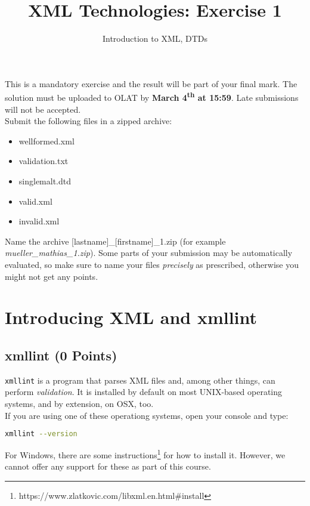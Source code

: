 \documentclass[a4paper, 12pt]{scrartcl}
\title{XML Technologies: Exercise 1}
\date{}
\subtitle{Introduction to XML, DTDs}
\begin{document}
\maketitle\vspace{-12ex}

\noindent This is a mandatory exercise and the result will be part of your final mark. The solution must be uploaded to OLAT by \textbf{March 4\textsuperscript{th} at 15:59}. Late submissions will not be accepted.\\


\noindent Submit the following files in a zipped archive:
\begin{itemize}
\item wellformed.xml
\item validation.txt
\item singlemalt.dtd
\item valid.xml
\item invalid.xml
\end{itemize}

\noindent Name the archive [lastname]\_[firstname]\_1.zip (for example \textit{mueller\_mathias\_1.zip}). Some parts of your submission may be automatically evaluated, so make sure to name your files \textit{precisely} as prescribed, otherwise you might not get any points.

\section{Introducing XML and xmllint}

\subsection{xmllint (0 Points)}
\texttt{xmllint} is a program that parses XML files and, among other things, can perform \emph{validation}. It is installed by default on most UNIX-based operating systems, and by extension, on OSX, too. \\

\noindent If you are using one of these operationg systems, open your console and type:

\begin{lstlisting}[language=bash]
  xmllint --version
\end{lstlisting}

\noindent For Windows, there are some instructions\footnote{https://www.zlatkovic.com/libxml.en.html\#install} for how to install it. However, we cannot offer any support for these as part of this course.
\end{document}
